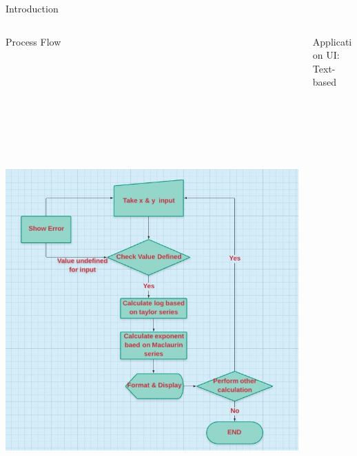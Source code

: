 \documentclass[final,hyperref={pdfpagelabels=false}]{beamer}
\begin{document}
\begin{frame}{}
\begin{block}{\Large Introduction}
		\end{block} 
		
		

		\begin{columns}[t]
			
			\begin{column}{.48\linewidth}
				\begin{block}{\Large Process Flow}
					\hspace{2cm} \includegraphics[width=30cm, height=20cm]{Flow.JPG}
				\end{block}
			\end{column}
			\begin{column}{.48\linewidth}
				\begin{block}{\Large Application UI: Text-based}

\end{block}
\end{column}
\end{columns}
\end{frame}
\end{document}

